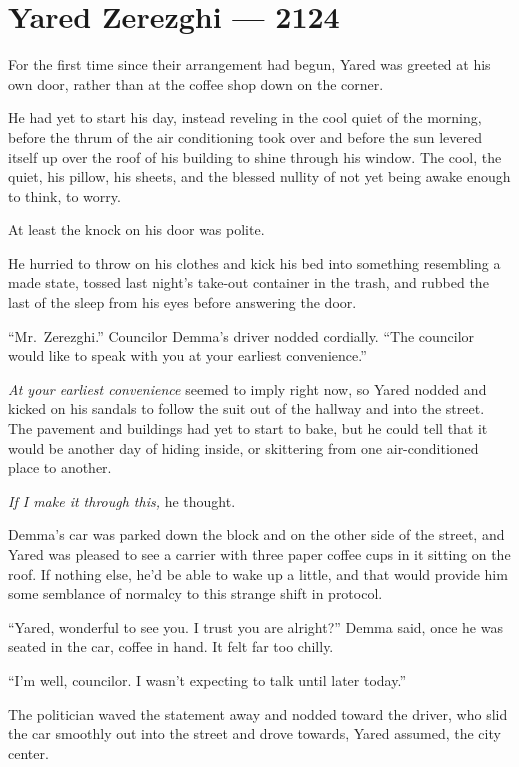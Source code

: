 \hypertarget{yared-zerezghi-2124}{%
\chapter{Yared Zerezghi — 2124}\label{yared-zerezghi-2124}}

For the first time since their arrangement had begun, Yared was greeted at his own door, rather than at the coffee shop down on the corner.

He had yet to start his day, instead reveling in the cool quiet of the morning, before the thrum of the air conditioning took over and before the sun levered itself up over the roof of his building to shine through his window. The cool, the quiet, his pillow, his sheets, and the blessed nullity of not yet being awake enough to think, to worry.

At least the knock on his door was polite.

He hurried to throw on his clothes and kick his bed into something resembling a made state, tossed last night's take-out container in the trash, and rubbed the last of the sleep from his eyes before answering the door.

``Mr.~Zerezghi.'' Councilor Demma's driver nodded cordially. ``The councilor would like to speak with you at your earliest convenience.''

\emph{At your earliest convenience} seemed to imply right now, so Yared nodded and kicked on his sandals to follow the suit out of the hallway and into the street. The pavement and buildings had yet to start to bake, but he could tell that it would be another day of hiding inside, or skittering from one air-conditioned place to another.

\emph{If I make it through this,} he thought.

Demma's car was parked down the block and on the other side of the street, and Yared was pleased to see a carrier with three paper coffee cups in it sitting on the roof. If nothing else, he'd be able to wake up a little, and that would provide him some semblance of normalcy to this strange shift in protocol.

``Yared, wonderful to see you. I trust you are alright?'' Demma said, once he was seated in the car, coffee in hand. It felt far too chilly.

``I'm well, councilor. I wasn't expecting to talk until later today.''

The politician waved the statement away and nodded toward the driver, who slid the car smoothly out into the street and drove towards, Yared assumed, the city center.


